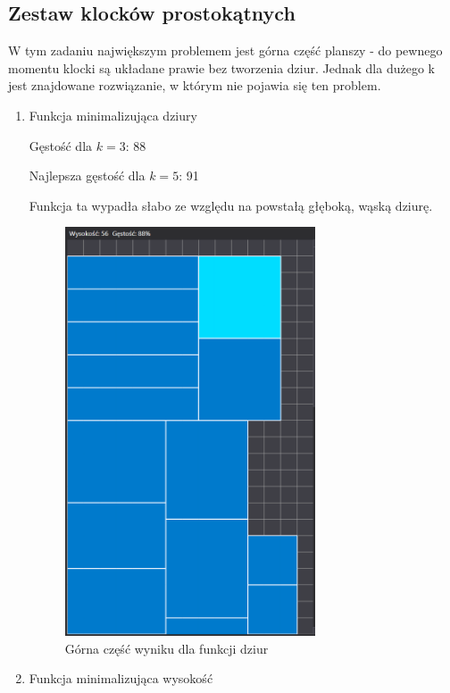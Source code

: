 \documentclass{article}
\begin{document}
\subsection{Zestaw klocków prostokątnych}
W tym zadaniu największym problemem jest górna część planszy - do pewnego momentu klocki są układane prawie bez tworzenia dziur. Jednak dla dużego k jest znajdowane rozwiązanie, w którym nie pojawia się ten problem.
\begin{enumerate}

\item Funkcja minimalizująca dziury

Gęstość dla $k=3$: 88

Najlepsza gęstość dla $k=5$: 91

Funkcja ta wypadła słabo ze względu na powstałą głęboką, wąską dziurę.
\begin{figure}[H]
\centering
\includegraphics[width=0.7\textwidth]{prostokaty_dziury.PNG}
\caption{Górna część wyniku dla funkcji dziur}
\end{figure}


\item Funkcja minimalizująca wysokość


\end{enumerate}
\end{document}
